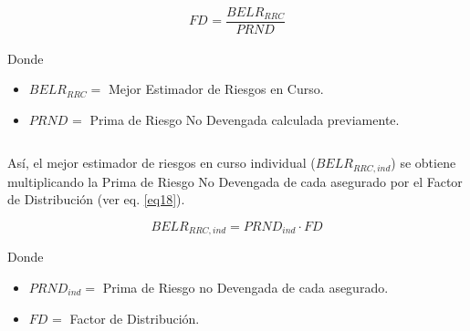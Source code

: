 \documentclass[11pt,twoside,openright,spanish]{report}
\numberwithin{equation}{chapter}
\numberwithin{figure}{chapter}
\numberwithin{table}{chapter}
\begin{document}
	 
	 \begin{equation}
	 	{FD}_{}^{}=\frac{{BELR}_{RRC}^{}}{{PRND}_{}}
	 	\label{eq17}
	 \end{equation}
	 
	 
	 Donde
	 
	 
	 \begin{itemize}
	 	\setlength\itemsep{-0.5em}
	 	\item $BELR_{RRC}=$ Mejor Estimador de Riesgos en Curso.
	 	
	 	\item $PRND_{}=$ Prima de Riesgo No Devengada calculada previamente.
	 	
	 \end{itemize}
	 
	 $ $
	 
	 
	 Así, el mejor estimador de riesgos en curso individual ($BELR_{RRC,ind}$) se obtiene multiplicando la Prima de Riesgo No Devengada de cada asegurado por el Factor de Distribución (ver eq. \ref{eq18}).
	 
	 
	 
	 \begin{comment}	
	 $
	 BELR_{RRC,ind}=\begin{cases}
	 PRND_{ind}\cdot FD_{}, & \text{$g \neq Salud Dental Individual$}\\
	 
	 PTND_{ind}\cdot FS_{BEL}^{RRC}, & \text{$g = Salud Dental Individual$}
	 \end{cases}
	 $
	 \end{comment}	
	 
	 \begin{equation}
	 	BELR_{RRC,ind}=PRND_{ind}\cdot FD_{}
	 	\label{eq18}
	 \end{equation}
	 
	 
	 
	 Donde
	 
	 
	 \begin{itemize}
	 	\setlength\itemsep{-0.5em}	
	 	\item $PRND_{ind}=$ Prima de Riesgo no Devengada de cada asegurado.
	 	
	 	\item $FD_{}^{}=$ Factor de Distribución.
	 \end{itemize}
	 
	 \begin{comment}
	 $PTND_{ind}=$ Prima de Tarifa no Devengada de cada asegurado
	 
	 
	 $FS_{BEL}^{RRC}=$ Factor de Siniestralidad última con información de mercado
	 \end{comment}
	 
\end{document}

